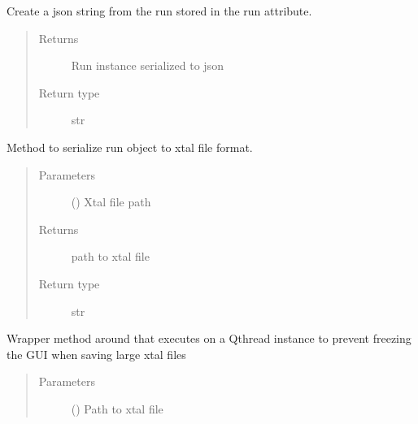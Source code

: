 \documentclass[letterpaper,10pt,english]{sphinxmanual}
\begin{document}
\begin{fulllineitems}
\begin{fulllineitems}
\label{\detokenize{polo.utils:polo.utils.io_utils.XtalWriter.run_to_dict}}
Create a json string from the run stored in the run attribute.
\begin{quote}\begin{description}
\item[{Returns}] \leavevmode
Run instance serialized to json

\item[{Return type}] \leavevmode
str

\end{description}\end{quote}

\end{fulllineitems}


\begin{fulllineitems}
\label{\detokenize{polo.utils:polo.utils.io_utils.XtalWriter.write_xtal_file}}
Method to serialize run object to xtal file format.
\begin{quote}\begin{description}
\item[{Parameters}] \leavevmode
{} () \textendash{} Xtal file path

\item[{Returns}] \leavevmode
path to xtal file

\item[{Return type}] \leavevmode
str

\end{description}\end{quote}

\end{fulllineitems}


\begin{fulllineitems}
\label{\detokenize{polo.utils:polo.utils.io_utils.XtalWriter.write_xtal_file_on_thread}}
Wrapper method around  that executes on a Qthread
instance to prevent freezing the GUI when saving large xtal files
\begin{quote}\begin{description}
\item[{Parameters}] \leavevmode
{} () \textendash{} Path to xtal file


\end{description}
\end{quote}
\end{fulllineitems}
\end{fulllineitems}
\end{document}
